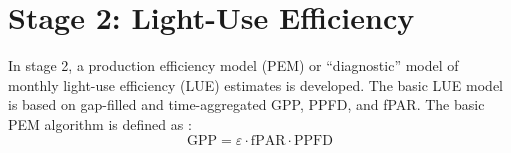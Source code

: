%
%
%
%
%
\section{Stage 2: Light-Use Efficiency}
\label{sec:mst2}
In stage 2, a production efficiency model (PEM) or ``diagnostic'' model of monthly light-use efficiency (LUE) estimates is developed.  
The basic LUE model is based on gap-filled and time-aggregated GPP, PPFD, and fPAR.  
The basic PEM algorithm is defined as \parencite[Eq. 1]{mccallum09}:
\begin{equation}
\label{eq:pem}
    \text{GPP} = \varepsilon \cdot \text{fPAR} \cdot \text{PPFD} 
\end{equation}

